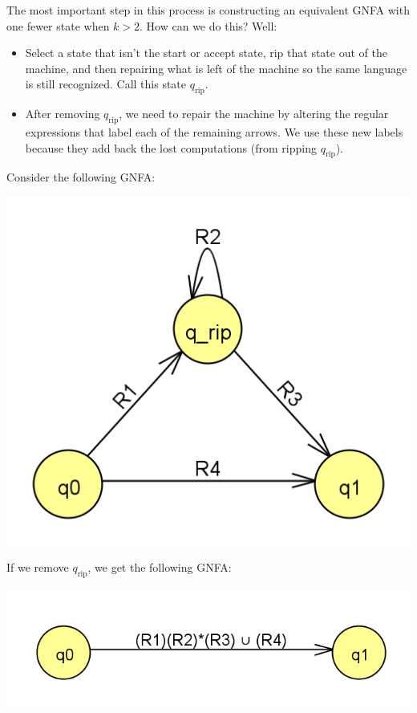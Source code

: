 \documentclass[letterpaper]{article}
\begin{document}
The most important step in this process is constructing an equivalent GNFA with one fewer state when $k > 2$. How can we do this? Well: 
\begin{itemize}
    \item Select a state that isn't the start or accept state, rip that state out of the machine, and then repairing what is left of the machine so the same language is still recognized. Call this state $q_{\text{rip}}$.
    \item After removing $q_{\text{rip}}$, we need to repair the machine by altering the regular expressions that label each of the remaining arrows. We use these new labels because they add back the lost computations (from ripping $q_{\text{rip}}$). 
\end{itemize}
Consider the following GNFA: 
\begin{center}
    \includegraphics[scale=0.4]{assets/gnfa_before.png}
\end{center}
If we remove $q_{\text{rip}}$, we get the following GNFA: 
\begin{center}
    \includegraphics[scale=0.4]{assets/gnfa_after.png}
\end{center}
\end{document}

